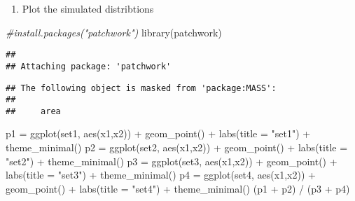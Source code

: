 \documentclass[
]{article}
\newenvironment{Shaded}{\begin{snugshade}}{\end{snugshade}}
\newcommand{\AttributeTok}[1]{\textcolor[rgb]{0.77,0.63,0.00}{#1}}
\newcommand{\CommentTok}[1]{\textcolor[rgb]{0.56,0.35,0.01}{\textit{#1}}}
\newcommand{\FunctionTok}[1]{\textcolor[rgb]{0.00,0.00,0.00}{#1}}
\newcommand{\NormalTok}[1]{#1}
\newcommand{\OtherTok}[1]{\textcolor[rgb]{0.56,0.35,0.01}{#1}}
\newcommand{\SpecialCharTok}[1]{\textcolor[rgb]{0.00,0.00,0.00}{#1}}
\newcommand{\StringTok}[1]{\textcolor[rgb]{0.31,0.60,0.02}{#1}}
\providecommand{\tightlist}{%
  \setlength{\itemsep}{0pt}\setlength{\parskip}{0pt}}
\begin{document}
\begin{enumerate}
\def\labelenumi{\alph{enumi})}
\setcounter{enumi}{1}
\tightlist
\item
  Plot the simulated distribtions
\end{enumerate}

\begin{Shaded}
\begin{Highlighting}[]
\CommentTok{\#install.packages("patchwork")}
\FunctionTok{library}\NormalTok{(patchwork)}
\end{Highlighting}
\end{Shaded}

\begin{verbatim}
## 
## Attaching package: 'patchwork'
\end{verbatim}

\begin{verbatim}
## The following object is masked from 'package:MASS':
## 
##     area
\end{verbatim}

\begin{Shaded}
\begin{Highlighting}[]
\NormalTok{p1 }\OtherTok{=} \FunctionTok{ggplot}\NormalTok{(set1, }\FunctionTok{aes}\NormalTok{(x1,x2)) }\SpecialCharTok{+} \FunctionTok{geom\_point}\NormalTok{() }\SpecialCharTok{+} \FunctionTok{labs}\NormalTok{(}\AttributeTok{title =} \StringTok{"set1"}\NormalTok{) }\SpecialCharTok{+} \FunctionTok{theme\_minimal}\NormalTok{()}
\NormalTok{p2 }\OtherTok{=} \FunctionTok{ggplot}\NormalTok{(set2, }\FunctionTok{aes}\NormalTok{(x1,x2)) }\SpecialCharTok{+} \FunctionTok{geom\_point}\NormalTok{() }\SpecialCharTok{+} \FunctionTok{labs}\NormalTok{(}\AttributeTok{title =} \StringTok{"set2"}\NormalTok{) }\SpecialCharTok{+} \FunctionTok{theme\_minimal}\NormalTok{()}
\NormalTok{p3 }\OtherTok{=} \FunctionTok{ggplot}\NormalTok{(set3, }\FunctionTok{aes}\NormalTok{(x1,x2)) }\SpecialCharTok{+} \FunctionTok{geom\_point}\NormalTok{() }\SpecialCharTok{+} \FunctionTok{labs}\NormalTok{(}\AttributeTok{title =} \StringTok{"set3"}\NormalTok{) }\SpecialCharTok{+} \FunctionTok{theme\_minimal}\NormalTok{()}
\NormalTok{p4 }\OtherTok{=} \FunctionTok{ggplot}\NormalTok{(set4, }\FunctionTok{aes}\NormalTok{(x1,x2)) }\SpecialCharTok{+} \FunctionTok{geom\_point}\NormalTok{() }\SpecialCharTok{+} \FunctionTok{labs}\NormalTok{(}\AttributeTok{title =} \StringTok{"set4"}\NormalTok{) }\SpecialCharTok{+} \FunctionTok{theme\_minimal}\NormalTok{()}
\NormalTok{(p1 }\SpecialCharTok{+}\NormalTok{ p2) }\SpecialCharTok{/}\NormalTok{ (p3 }\SpecialCharTok{+}\NormalTok{ p4)}
\end{Highlighting}
\end{Shaded}
\end{document}
